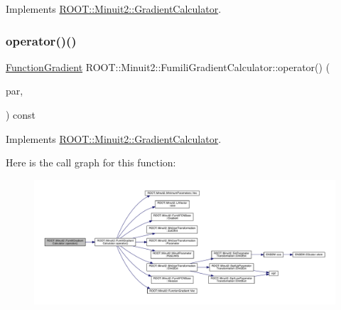 Implements \mbox{\hyperlink{classROOT_1_1Minuit2_1_1GradientCalculator_a1bae913e96ffc9ece28664a5f6f79cb0}{R\+O\+O\+T\+::\+Minuit2\+::\+Gradient\+Calculator}}.

\mbox{\label{classROOT_1_1Minuit2_1_1FumiliGradientCalculator_a652f65091b404ebda9a645d7ba92b3b6}} 
\subsubsection{\texorpdfstring{operator()()}{operator()()}\hspace{0.1cm}{\footnotesize\ttfamily [3/4]}}
{\footnotesize\ttfamily \mbox{\hyperlink{classROOT_1_1Minuit2_1_1FunctionGradient}{Function\+Gradient}} R\+O\+O\+T\+::\+Minuit2\+::\+Fumili\+Gradient\+Calculator\+::operator() (\begin{DoxyParamCaption}\item[{const \mbox{\hyperlink{classROOT_1_1Minuit2_1_1MinimumParameters}{Minimum\+Parameters}} \&}]{par,  }\item[{const \mbox{\hyperlink{classROOT_1_1Minuit2_1_1FunctionGradient}{Function\+Gradient}} \&}]{ }\end{DoxyParamCaption}) const\hspace{0.3cm}{\ttfamily [virtual]}}



Implements \mbox{\hyperlink{classROOT_1_1Minuit2_1_1GradientCalculator_a1809c1e8a89d32aabf7835e9690c2916}{R\+O\+O\+T\+::\+Minuit2\+::\+Gradient\+Calculator}}.

Here is the call graph for this function\+:\nopagebreak
\begin{figure}[H]
\begin{center}
\leavevmode
\includegraphics[width=350pt]{d8/de6/classROOT_1_1Minuit2_1_1FumiliGradientCalculator_a652f65091b404ebda9a645d7ba92b3b6_cgraph}
\end{center}
\end{figure}
\mbox{\label{classROOT_1_1Minuit2_1_1FumiliGradientCalculator_a652f65091b404ebda9a645d7ba92b3b6}} 
